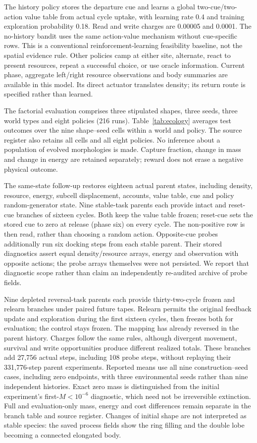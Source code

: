 The history policy stores the departure cue and learns a global two-cue/two-action value table from actual cycle uptake, with learning rate 0.4 and training exploration probability 0.18. Read and write charges are 0.00005 and 0.0001. The no-history bandit uses the same action-value mechanism without cue-specific rows. This is a conventional reinforcement-learning feasibility baseline\cite{sutton,williams}, not the spatial evidence rule. Other policies camp at either site, alternate, react to present resources, repeat a successful choice, or use oracle information. Current phase, aggregate left/right resource observations and body summaries are available in this model. Its direct actuator translates density; its return route is specified rather than learned.

The factorial evaluation comprises three stipulated shapes, three seeds, three world types and eight policies (216 runs). Table~\ref{tab:ecology} averages test outcomes over the nine shape--seed cells within a world and policy. The source register also retains all cells and all eight policies. No inference about a population of evolved morphologies is made. Capture fraction, change in mass and change in energy are retained separately; reward does not erase a negative physical outcome.

The same-state follow-up restores eighteen actual parent states, including density, resource, energy, subcell displacement, accounts, value table, cue and policy random-generator state. Nine stable-task parents each provide intact and reset-cue branches of sixteen cycles. Both keep the value table frozen; reset-cue sets the stored cue to zero at release (phase six) on every cycle. The non-positive row is then read, rather than choosing a random action. Opposite-cue probes additionally run six docking steps from each stable parent. Their stored diagnostics assert equal density/resource arrays, energy and observation with opposite actions; the probe arrays themselves were not persisted. We report that diagnostic scope rather than claim an independently re-audited archive of probe fields.

Nine depleted reversal-task parents each provide thirty-two-cycle frozen and relearn branches under paired future tapes. Relearn permits the original feedback update and exploration during the first sixteen cycles, then freezes both for evaluation; the control stays frozen. The mapping has already reversed in the parent history. Charges follow the same rules, although divergent movement, survival and write opportunities produce different realized totals. These branches add 27,756 actual steps, including 108 probe steps, without replaying their 331,776-step parent experiments. Reported means use all nine construction--seed cases, including zero endpoints, with three environmental seeds rather than nine independent histories. Exact zero mass is distinguished from the initial experiment's first-$M<10^{-6}$ diagnostic, which need not be irreversible extinction. Full and evaluation-only mass, energy and cost differences remain separate in the branch table and source register. Changes of initial shape are not interpreted as stable species: the saved process fields show the ring filling and the double lobe becoming a connected elongated body.


